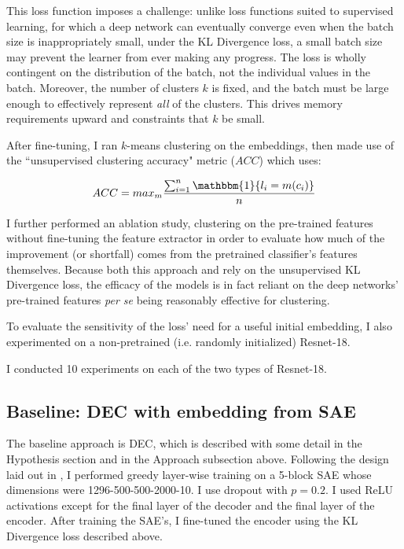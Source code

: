 This loss function imposes a challenge: unlike loss functions suited to supervised learning, for which a deep network can eventually converge even when the batch size is inappropriately small, under the KL Divergence loss, a small batch size may prevent the learner from ever making any progress. The loss is wholly contingent on the distribution of the batch, not the individual values in the batch. Moreover, the number of clusters $k$ is fixed, and the batch must be large enough to effectively represent \textit{all} of the clusters. This drives memory requirements upward and constraints that $k$ be small.

After fine-tuning, I ran $k$-means clustering on the embeddings, then made use of the ``unsupervised clustering accuracy" metric ($ACC$) which \cite{xie2016unsupervised} uses:

\begin{equation} \label{eq:acc}
ACC = max_m \frac{\sum_{i=1}^n \mathbbm{1}\{l_i = m(c_i)\}}{n}
\end{equation}

I further performed an ablation study, clustering on the pre-trained features without fine-tuning the feature extractor in order to evaluate how much of the improvement (or shortfall) comes from the pretrained classifier's features themselves. Because both this approach and \cite{xie2016unsupervised} rely on the unsupervised KL Divergence loss, the efficacy of the models is in fact reliant on the deep networks' pre-trained features \textit{per se} being reasonably effective for clustering.

To evaluate the sensitivity of the loss' need for a useful initial embedding, I also experimented on a non-pretrained (i.e. randomly initialized) Resnet-18.

I conducted 10 experiments on each of the two types of Resnet-18.

\subsection{Baseline: DEC with embedding from SAE}

The baseline approach is DEC, which is described with some detail in the Hypothesis section and in the Approach subsection above. Following the design laid out in \cite{xie2016unsupervised}, I performed greedy layer-wise training on a 5-block SAE whose dimensions were 1296-500-500-2000-10. I use dropout with $p=0.2$. I used ReLU activations except for the final layer of the decoder and the final layer of the encoder. After training the SAE's, I fine-tuned the encoder using the KL Divergence loss described above.

